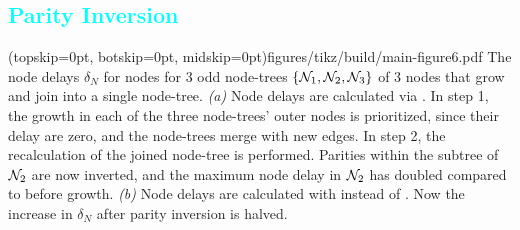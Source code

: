 



\subsection{\textcolor{cyan}{Parity Inversion}}\label{sec:inversion}

\Figure[tb](topskip=0pt, botskip=0pt, midskip=0pt){figures/tikz/build/main-figure6.pdf}{
    The node delays $\delta_N$ for nodes for 3 odd node-trees $\{\mathcal{N}_1, \mathcal{N}_2, \mathcal{N}_3\}$ of 3 nodes that grow and join into a single node-tree. \emph{(a)} Node delays are calculated via . In step 1, the growth in each of the three node-trees' outer nodes is prioritized, since their delay are zero, and the node-trees merge with new edges. In step 2, the recalculation of the joined node-tree is performed. Parities within the subtree of $\mathcal{N}_2$ are now inverted, and the maximum node delay in $\mathcal{N}_2$ has doubled compared to before growth. \emph{(b)} Node delays are calculated with  instead of . Now the increase in $\delta_N$ after parity inversion is halved.\label{fig:partialdfs}}

